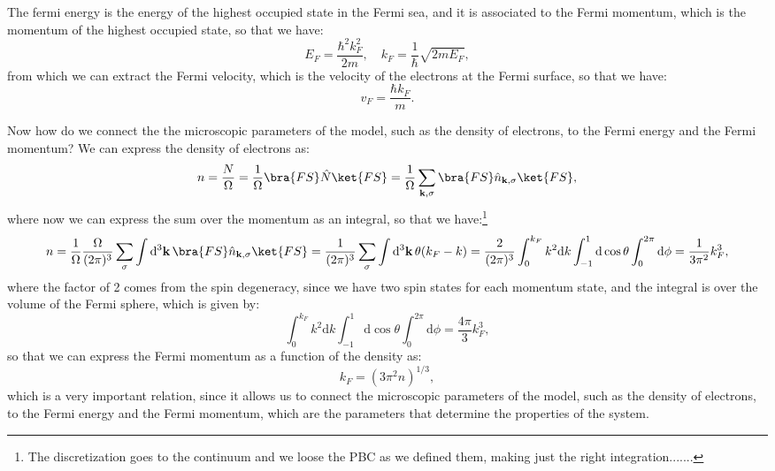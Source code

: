 The fermi energy is the energy of the highest occupied state in the Fermi sea, and it is associated to the Fermi momentum, which is the momentum of the highest occupied state, so that we have:
\[
    E_F = \frac{\hbar^2 k_F^2}{2m}, \quad k_F = \frac{1}{\hbar} \sqrt{2m E_F},
\]
from which we can extract the Fermi velocity, which is the velocity of the electrons at the Fermi surface, so that we have:
\[
    v_F = \frac{\hbar k_F}{m}.
\]

Now how do we connect the the microscopic parameters of the model, such as the density of electrons, to the Fermi energy and the Fermi momentum? We can express the density of electrons as:
\[
    n = \frac{N}{\Omega} = \frac{1}{\Omega} \bra{FS} \hat{N} \ket{FS} = \frac{1}{\Omega} \sum_{\mathbf{k}, \sigma} \bra{FS} \hat{n}_{\mathbf{k}, \sigma} \ket{FS},
\]
where now we can express the sum over the momentum as an integral, so that we have:\footnote{The discretization goes to the continuum and we loose the PBC as we defined them, making just the right integration.......}
\[
    n = \frac{1}{\Omega} \frac{\Omega}{(2\pi)^3} \sum_{\sigma} \int \mathrm{d}^3 \mathbf{k} \, \bra{FS} \hat{n}_{\mathbf{k}, \sigma} \ket{FS} = \frac{1}{(2\pi)^3} \sum_{\sigma} \int \mathrm{d}^3 \mathbf{k} \, \theta(k_F - k) = \frac{2}{(2\pi)^3} \int_0^{k_F} k^2 \mathrm{d}k \int_{-1}^{1} \mathrm{d} \cos\theta \int_0^{2\pi} \mathrm{d} \phi = \frac{1}{3\pi^2} k_F^3,
\]
where the factor of 2 comes from the spin degeneracy, since we have two spin states for each momentum state, and the integral is over the volume of the Fermi sphere, which is given by:
\[
    \int_0^{k_F} k^2 \mathrm{d}k \int_{-1}^{1} \mathrm{d} \cos\theta \int_0^{2\pi} \mathrm{d} \phi = \frac{4\pi}{3} k_F^3,
\]
so that we can express the Fermi momentum as a function of the density as:
\[
    k_F = (3\pi^2 n)^{1/3},
\]
which is a very important relation, since it allows us to connect the microscopic parameters of the model, such as the density of electrons, to the Fermi energy and the Fermi momentum, which are the parameters that determine the properties of the system.

